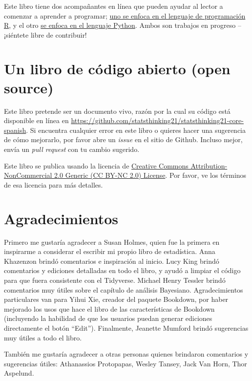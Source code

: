 \documentclass[
  12pt,
]{book}
\begin{document}
Este libro tiene dos acompañantes en línea que pueden ayudar al lector a comenzar a aprender a programar; \href{https://statsthinking21.github.io/statsthinking21-R-site/}{uno se enfoca en el lenguaje de programación R}, y el otro \href{https://statsthinking21.github.io/statsthinking21-python/}{se enfoca en el lenguaje Python}. Ambos son trabajos en progreso -- ¡siéntete libre de contribuir!

\hypertarget{un-libro-de-cuxf3digo-abierto-open-source}{%
\section{Un libro de código abierto (open source)}\label{un-libro-de-cuxf3digo-abierto-open-source}}

Este libro pretende ser un documento vivo, razón por la cual su código está disponible en línea en \url{https://github.com/statsthinking21/statsthinking21-core-spanish}. Si encuentra cualquier error en este libro o quieres hacer una sugerencia de cómo mejorarlo, por favor abre un \emph{issue} en el sitio de Github. Incluso mejor, envía un \emph{pull request} con tu cambio sugerido.

Este libro se publica usando la licencia de \href{https://creativecommons.org/licenses/by-nc/2.0/}{Creative Commons Attribution-NonCommercial 2.0 Generic (CC BY-NC 2.0) License}. Por favor, ve los términos de esa licencia para más detalles.

\hypertarget{agradecimientos}{%
\section{Agradecimientos}\label{agradecimientos}}

Primero me gustaría agradecer a Susan Holmes, quien fue la primera en inspirarme a considerar el escribir mi propio libro de estadística. Anna Khazenzon brindó comentarios e inspiración al inicio. Lucy King brindó comentarios y ediciones detalladas en todo el libro, y ayudó a limpiar el código para que fuera consistente con el Tidyverse. Michael Henry Tessler brindó comentarios muy útiles sobre el capítulo de análisis Bayesiano. Agradecimientos particulares van para Yihui Xie, creador del paquete Bookdown, por haber mejorado los usos que hace el libro de las características de Bookdown (incluyendo la habilidad de que los usuarios puedan generar ediciones directamente el botón ``Edit''). Finalmente, Jeanette Mumford brindó sugerencias muy útiles a todo el libro.

También me gustaría agradecer a otras personas quienes brindaron comentarios y sugerencias útiles: Athanassios Protopapas, Wesley Tansey, Jack Van Horn, Thor Aspelund.
\end{document}
